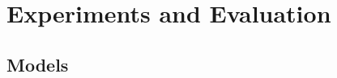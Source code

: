 \documentclass[11pt,a4paper]{article}
\begin{document}





\section{Experiments and Evaluation}

\subsection{Models}



\end{document}
